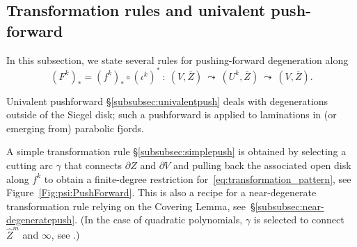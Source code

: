 \documentclass{amsart}
\newcommand{\1}{{\mathbb 1 }}
\newcommand{\Width}{{\mathcal W}}
\newcommand\RR{\mathcal{R}}
\newcommand{\wZ}{{\widehat Z}}
\newcommand{\Dbb}{{\mathfrak{D}}}
\newtheorem{lem}[thm]{Lemma}
\theoremstyle{remark}
\numberwithin{equation}{section}
\theoremstyle{definition}
\newcommand{\Fjord}{{\mathfrak F}}
\begin{document}

\subsection{Transformation rules and univalent push-forward}\label{ss:push forw curves} In this subsection, we state several rules for pushing-forward degeneration along 
\begin{equation}
\label{eq:transformation_pattern}
     (F^k)_*=(f^k)_*\circ (\iota^k)^*\ \colon \ (V,\overline Z)\ \leadsto\ (U^k,\overline Z)\ \leadsto \ (V,\overline Z).
\end{equation}


Univalent pushforward \S\ref{subsubsec:univalentpush} deals with degenerations outside of the Siegel disk; such a pushforward is applied to laminations in (or emerging from) parabolic fjords.

A simple transformation rule \S\ref{subsubsec:simplepush} is obtained by selecting a cutting arc $\gamma$ that connects $\partial Z$ and $\partial V$ and pulling back the associated open disk along $f^k$ to obtain a finite-degree restriction for~\eqref{eq:transformation_pattern}, see Figure~\ref{Fig:psi:PushForward}. This is also a recipe for a near-degenerate transformation rule relying on the Covering Lemma, see~\S\ref{subsubsec:near-degeneratepush}. (In the case of quadratic polynomials, $\gamma$ is selected to connect $\wZ^m$ and $\infty$, see \cite[\S 8.1.2]{DL22}.) 
\end{document}
